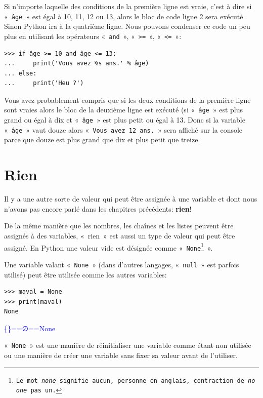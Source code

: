 Si n'importe laquelle des conditions de la première ligne est vraie, c'est à dire si  « \texttt{âge} » est égal à 10, 11, 12 ou 13, alors le bloc de code ligne 2 sera exécuté. Sinon Python ira à la quatrième ligne. 
Nous pouvons condenser ce code un peu plus en utilisant les opérateurs « \texttt{and} », « \texttt{>=} », « \texttt{<=} »:

\begin{Verbatim}[frame=single,rulecolor=\color{green}, label=à taper avec attention]
>>> if âge >= 10 and âge <= 13:
...     print('Vous avez %s ans.' % âge)
... else:
...     print('Heu ?')
\end{Verbatim}

Vous avez probablement compris que si les deux conditions de la première ligne sont vraies alors le bloc de la deuxième ligne est exécuté (si « \texttt{âge} »  est plus grand ou égal à dix et « \texttt{âge} » est plus petit ou égal à 13. Donc si la variable « \texttt{âge} » vaut douze alors « \texttt{Vous avez 12 ans.} » sera affiché sur la console parce que douze est plus grand que dix et plus petit que treize.

\section{Rien}
Il y a une autre sorte de valeur qui peut être assignée à une variable et dont nous n'avons pas encore parlé dans les chapitres précédents: \textbf{rien}!

De la même manière que les nombres, les chaînes et les listes peuvent être assignés à des variables, « {rien} »  est aussi un type de valeur qui peut être assigné. En Python une valeur vide est désignée comme « \texttt{None\footnote{Le mot \emph{none} signifie aucun, personne en anglais, contraction de \emph{no one} pas un.}} ».

Une variable valant « \texttt{None} » (dans d'autres langages, « \texttt{null} » est parfois utilisé) peut être utilisée comme les autres variables:

\begin{Verbatim}[frame=single,rulecolor=\color{mbleu}, label=à taper]
>>> maval = None
>>> print(maval)
None
\end{Verbatim}

\begin{center}
\textcolor{blue}{\textrm{\{\}==∅==None}}
\end{center}

« \texttt{None} » est une manière de réinitialiser une variable comme étant non utilisée ou une manière de créer une variable sans fixer sa valeur avant de l'utiliser.

